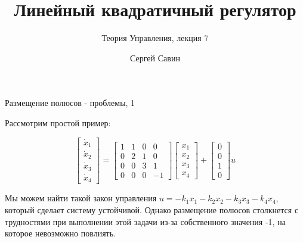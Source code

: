 \documentclass{beamer}
\title{Линейный квадратичный регулятор}
\subtitle{Теория Управления, лекция 7}
\author{Сергей Савин}
\date{\mydate}
\begin{document}
\maketitle




\begin{frame}{Размещение полюсов - проблемы, 1}
	\begin{flushleft}
		
		Рассмотрим простой пример:
		
		\begin{equation}
			\begin{bmatrix}
				\dot {x}_1 \\ 
				\dot {x}_2 \\ 
				\dot {x}_3 \\ 
				\dot {x}_4 
			\end{bmatrix}
			=
			\begin{bmatrix}
				1 &1 &0 &0\\
				0 &2 &1 &0\\
				0 &0 &3 &1\\
				0 &0 &0 &-1
			\end{bmatrix}
			\begin{bmatrix}
				x_1 \\ 
				x_2 \\ 
				x_3 \\ 
				x_4 
			\end{bmatrix}
			+
			\begin{bmatrix}
				0 \\ 
				0 \\ 
				1 \\ 
				0 
			\end{bmatrix}
			u
		\end{equation}
		
		Мы можем найти такой закон управления $u = - k_1 x_1- k_2 x_2- k_3 x_3- k_4x_4$, который сделает систему устойчивой. Однако размещение полюсов столкнется с трудностями при выполнении этой задачи из-за собственного значения -1, на которое невозможно повлиять.
		
		
	\end{flushleft}
\end{frame}
\end{document}
